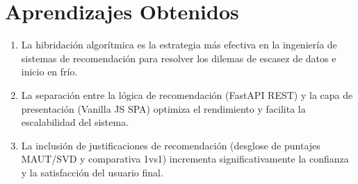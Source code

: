 \section{Aprendizajes Obtenidos}
\begin{enumerate}
    \item La hibridación algorítmica es la estrategia más efectiva en la ingeniería de sistemas de recomendación para resolver los dilemas de escasez de datos e inicio en frío.
    \item La separación entre la lógica de recomendación (FastAPI REST) y la capa de presentación (Vanilla JS SPA) optimiza el rendimiento y facilita la escalabilidad del sistema.
    \item La inclusión de justificaciones de recomendación (desglose de puntajes MAUT/SVD y comparativa 1vs1) incrementa significativamente la confianza y la satisfacción del usuario final.
\end{enumerate}
